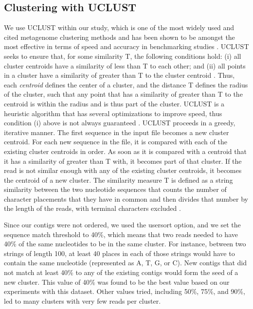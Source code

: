 \subsection{Clustering with UCLUST}

We use UCLUST within our study, which is one of the most widely used and cited metagenome clustering methods and has been shown to be amongst the most effective in terms of speed and accuracy in benchmarking studies \cite{bonder090112, sun042711}. UCLUST seeks to ensure that, for some similarity T, the following conditions hold: (i) all cluster centroids have a similarity of less than T to each other; and (ii) all points in a cluster have a similarity of greater than T to the cluster centroid \cite{Edgar10}. Thus, each \emph{centroid} defines the center of a cluster, and the distance T defines the radius of the cluster, such that any point that has a similarity of greater than T to the centroid is within the radius and is thus part of the cluster. UCLUST is a heuristic algorithm that has several optimizations to improve speed, thus condition (i) above is not always guaranteed \cite{Edgar10}. UCLUST proceeds in a greedy, iterative manner. The first sequence in the input file becomes a new cluster centroid. For each new sequence in the file, it is compared with each of the existing cluster centroids in order. As soon as it is compared with a centroid that it has a similarity of greater than T with, it becomes part of that cluster. If the read is not similar enough with any of the existing cluster centroids, it becomes the centroid of a new cluster. The similarity measure T is defined as a string similarity between the two nucleotide sequences that counts the number of character placements that they have in common and then divides that number by the length of the reads, with terminal characters excluded \cite{Edgar10}. 

Since our contigs were not ordered, we used the usersort option, and we set the sequence match threshold to 40\%, which means that two reads needed to have 40\% of the same nucleotides to be in the same cluster. For instance, between two strings of length 100, at least 40 places in each of those strings would have to contain the same nucleotide (represented as A, T, G, or C). New contigs that did not match at least 40\% to any of the existing contigs would form the seed of a new cluster. This value of 40\% was found to be the best value based on our experiments with this dataset. Other values tried, including 50\%, 75\%, and 90\%, led to many clusters with very few reads per cluster.

